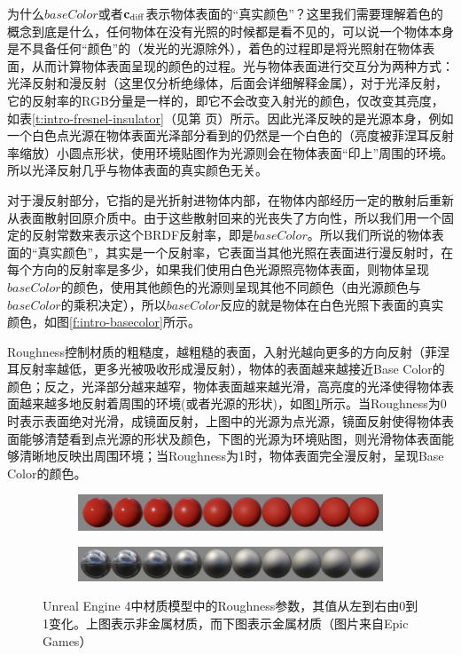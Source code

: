 \begin{shaded}
为什么$baseColor$或者$\mathbf{c}_{\rm diff}$表示物体表面的“真实颜色”？这里我们需要理解着色的概念到底是什么，任何物体在没有光照的时候都是看不见的，可以说一个物体本身是不具备任何“颜色”的（发光的光源除外），着色的过程即是将光照射在物体表面，从而计算物体表面呈现的颜色的过程。光与物体表面进行交互分为两种方式：光泽反射和漫反射（这里仅分析绝缘体，后面会详细解释金属），对于光泽反射，它的反射率的RGB分量是一样的，即它不会改变入射光的颜色，仅改变其亮度，如表\ref{t:intro-fresnel-insulator}（见第\pageref{t:intro-fresnel-insulator} 页）所示。因此光泽反映的是光源本身，例如一个白色点光源在物体表面光泽部分看到的仍然是一个白色的（亮度被菲涅耳反射率缩放）小圆点形状，使用环境贴图作为光源则会在物体表面“印上”周围的环境。所以光泽反射几乎与物体表面的真实颜色无关。

对于漫反射部分，它指的是光折射进物体内部，在物体内部经历一定的散射后重新从表面散射回原介质中。由于这些散射回来的光丧失了方向性，所以我们用一个固定的反射常数来表示这个BRDF反射率，即是$baseColor$。所以我们所说的物体表面的“真实颜色”，其实是一个反射率，它表面当其他光照在表面进行漫反射时，在每个方向的反射率是多少，如果我们使用白色光源照亮物体表面，则物体呈现$baseColor$的颜色，使用其他颜色的光源则呈现其他不同颜色（由光源颜色与$baseColor$的乘积决定），所以$baseColor$反应的就是物体在白色光照下表面的真实颜色，如图\ref{f:intro-basecolor}所示。
\end{shaded}

Roughness控制材质的粗糙度，越粗糙的表面，入射光越向更多的方向反射（菲涅耳反射率越低，更多光被吸收形成漫反射），物体的表面越来越接近Base Color的颜色；反之，光泽部分越来越窄，物体表面越来越光滑，高亮度的光泽使得物体表面越来越多地反射着周围的环境(或者光源的形状)，如图\ref{f:intro-ue4-material-roughness}所示。当Roughness为0时表示表面绝对光滑，成镜面反射，上图中的光源为点光源，镜面反射使得物体表面能够清楚看到点光源的形状及颜色，下图的光源为环境贴图，则光滑物体表面能够清晰地反映出周围环境；当Roughness为1时，物体表面完全漫反射，呈现Base Color的颜色。

\begin{figure}
\begin{fullwidth}
	\begin{subfigure}[b]{1\thewidth}
		\includegraphics[width=1.\textwidth]{graphics/gi/roughness_nonmetal}
	\end{subfigure}
	\begin{subfigure}[b]{1\thewidth}
		\includegraphics[width=1.\textwidth]{graphics/gi/roughness_metal}
	\end{subfigure}
\caption{Unreal Engine 4中材质模型中的Roughness参数，其值从左到右由0到1变化。上图表示非金属材质，而下图表示金属材质（图片来自Epic Games）}
\label{f:intro-ue4-material-roughness}
\end{fullwidth}
\end{figure}

